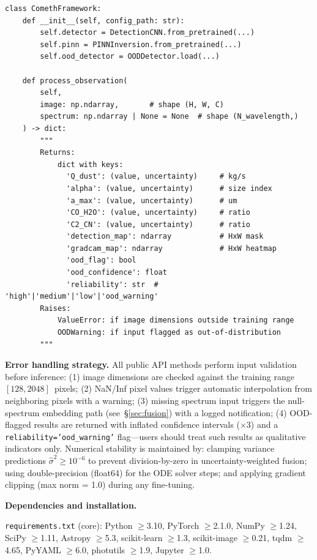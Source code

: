 \documentclass[usenatbib]{mnras}
\begin{document}
\begin{verbatim}
class ComethFramework:
    def __init__(self, config_path: str):
        self.detector = DetectionCNN.from_pretrained(...)
        self.pinn = PINNInversion.from_pretrained(...)
        self.ood_detector = OODDetector.load(...)

    def process_observation(
        self,
        image: np.ndarray,       # shape (H, W, C)
        spectrum: np.ndarray | None = None  # shape (N_wavelength,)
    ) -> dict:
        """
        Returns:
            dict with keys:
              'Q_dust': (value, uncertainty)     # kg/s
              'alpha': (value, uncertainty)      # size index
              'a_max': (value, uncertainty)      # um
              'CO_H2O': (value, uncertainty)     # ratio
              'C2_CN': (value, uncertainty)      # ratio
              'detection_map': ndarray           # HxW mask
              'gradcam_map': ndarray             # HxW heatmap
              'ood_flag': bool
              'ood_confidence': float
              'reliability': str  # 'high'|'medium'|'low'|'ood_warning'
        Raises:
            ValueError: if image dimensions outside training range
            OODWarning: if input flagged as out-of-distribution
        """
\end{verbatim}

\textbf{Error handling strategy.} All public API methods perform input validation before inference: (1) image dimensions are checked against the training range $[128, 2048]$~pixels; (2) NaN/Inf pixel values trigger automatic interpolation from neighboring pixels with a warning; (3) missing spectrum input triggers the null-spectrum embedding path (see~\S\ref{sec:fusion}) with a logged notification; (4) OOD-flagged results are returned with inflated confidence intervals ($\times 3$) and a {\tt reliability='ood\_warning'} flag---users should treat such results as qualitative indicators only. Numerical stability is maintained by: clamping variance predictions $\hat{\sigma}^2 \geq 10^{-6}$ to prevent division-by-zero in uncertainty-weighted fusion; using double-precision (float64) for the ODE solver steps; and applying gradient clipping (max norm = 1.0) during any fine-tuning.

\textbf{Dependencies and installation.}

{\tt requirements.txt} (core): Python $\geq$3.10, PyTorch $\geq$2.1.0, NumPy $\geq$1.24, SciPy $\geq$1.11, Astropy $\geq$5.3, scikit-learn $\geq$1.3, scikit-image $\geq$0.21, tqdm $\geq$4.65, PyYAML $\geq$6.0, photutils $\geq$1.9, Jupyter $\geq$1.0.
\end{document}
